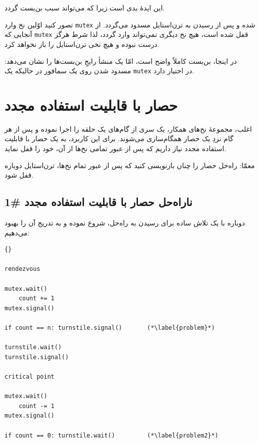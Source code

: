 \documentclass{book}
\newcommand{\clearemptydoublepage}{}%
\begin{document}
    این ایدهٔ بدی است زیرا که می‌تواند سبب بن‌بست گردد. 

    تصور کنید اوّلین نخ وارد \texttt{mutex} شده و پس از رسیدن به تر‌ن‌استایل مسدود می‌گردد. 
    از آنجایی که \texttt{mutex} قفل شده است، هیچ نخ دیگری نمی‌تواند وارد گردد، لذا شرط 
     هرگز درست نبوده و هیچ نخی ترن‌استایل را باز نخواهد کرد. 

    در اینجا، بن‌بست کاملاً واضح است، امّا یک منشأ رایجِ بن‌بست‌ها را نشان می‌دهد: مسدود شدن روی یک سمافور در حالیکه یک \texttt{mutex} در اختیار دارد. 

\section {حصار با قابلیت استفاده مجدد}
\label{rebar}

    اغلب، مجموعهٔ نخ‌های همکار، یک سری از گام‌های یک حلقه را اجرا نموده و پس از هر گام نزدِ یک حصار همگام‌سازی می‌شوند.
    برای این کاربرد، به یک حصار با قابلیت استفاده مجدد نیاز داریم که پس از عبور تمامی نخ‌ها از آن، خود را قفل نماید.  

    معمّا: راه‌حل حصار را چنان بازنویسی کنید که پس از عبور تمام نخ‌ها، ترن‌استایل دوباره قفل شود.

\clearemptydoublepage
\subsection{ ناراه‌حل حصار با قابلیت استفاده مجدد  \#1}

    دوباره با یک تلاش ساده برای رسیدن به راه‌حل، شروع نموده و به تدریج آن را بهبود می‌دهیم:

\begin{latin}
\begin{lstlisting}[title=\rl{  ناراه‌حل حصار با قابلیت استفاده مجدد}]{} 

rendezvous

mutex.wait()
    count += 1
mutex.signal()

if count == n: turnstile.signal()       (*\label{problem}*)

turnstile.wait()
turnstile.signal()

critical point

mutex.wait()
    count -= 1
mutex.signal()

if count == 0: turnstile.wait()         (*\label{problem2}*)
\end{lstlisting}
\end{latin}
\end{document}

